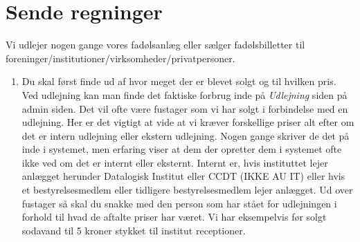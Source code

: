 \section{Sende regninger}
Vi udlejer nogen gange vores fadølsanlæg eller sælger fadølsbilletter til\\ foreninger/institutioner/virksomheder/privatpersoner.
\begin{enumerate}
    \item Du skal først finde ud af hvor meget der er blevet solgt og til hvilken pris. Ved udlejning kan man finde det faktiske forbrug inde på \textit{Udlejning} siden på admin siden. Det vil ofte være fustager som vi har solgt i forbindelse med en udlejning. Her er det vigtigt at vide at vi kræver forskellige priser alt efter om det er intern udlejning eller ekstern udlejning. Nogen gange skriver de det på inde i systemet, men erfaring viser at dem der opretter dem i systemet ofte ikke ved om det er internt eller eksternt. Internt er, hvis instituttet lejer anlægget herunder Datalogisk Institut eller CCDT (IKKE AU IT) eller hvis et bestyrelsesmedlem eller tidligere bestyrelsesmedlem lejer anlægget. Ud over fustager så skal du snakke med den person som har stået for udlejningen i forhold til hvad de aftalte priser har været. Vi har eksempelvis før solgt sodavand til 5 kroner stykket til institut receptioner.

\end{enumerate}
